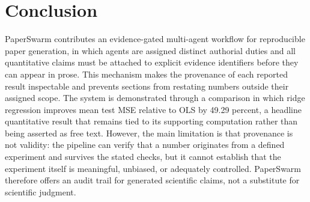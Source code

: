 \section{Conclusion}

PaperSwarm contributes an evidence-gated multi-agent workflow for reproducible paper generation, in which agents are assigned distinct authorial duties and all quantitative claims must be attached to explicit evidence identifiers before they can appear in prose. This mechanism makes the provenance of each reported result inspectable and prevents sections from restating numbers outside their assigned scope. The system is demonstrated through a comparison in which ridge regression improves mean test MSE relative to OLS by 49.29 percent, a headline quantitative result that remains tied to its supporting computation rather than being asserted as free text. However, the main limitation is that provenance is not validity: the pipeline can verify that a number originates from a defined experiment and survives the stated checks, but it cannot establish that the experiment itself is meaningful, unbiased, or adequately controlled. PaperSwarm therefore offers an audit trail for generated scientific claims, not a substitute for scientific judgment.
